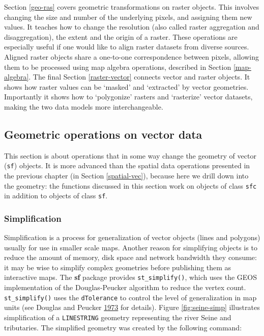 \documentclass[]{krantz}
\begin{document}
Section \ref{geo-ras} covers geometric transformations on raster objects.
This involves changing the size and number of the underlying pixels, and assigning them new values.
It teaches how to change the resolution (also called raster aggregation and disaggregation), the extent and the origin of a raster.
These operations are especially useful if one would like to align raster datasets from diverse sources.
Aligned raster objects share a one-to-one correspondence between pixels, allowing them to be processed using map algebra operations, described in Section \ref{map-algebra}. The final Section \ref{raster-vector} connects vector and raster objects.
It shows how raster values can be `masked' and `extracted' by vector geometries.
Importantly it shows how to `polygonize' rasters and `rasterize' vector datasets, making the two data models more interchangeable.

\hypertarget{geo-vec}{%
\subsection{Geometric operations on vector data}\label{geo-vec}}

This section is about operations that in some way change the geometry of vector (\texttt{sf}) objects.
It is more advanced than the spatial data operations presented in the previous chapter (in Section \ref{spatial-vec}), because here we drill down into the geometry:
the functions discussed in this section work on objects of class \texttt{sfc} in addition to objects of class \texttt{sf}.

\hypertarget{simplification}{%
\subsubsection{Simplification}\label{simplification}}

Simplification is a process for generalization of vector objects (lines and polygons) usually for use in smaller scale maps.
Another reason for simplifying objects is to reduce the amount of memory, disk space and network bandwidth they consume:
it may be wise to simplify complex geometries before publishing them as interactive maps.
The \textbf{sf} package provides \texttt{st\_simplify()}, which uses the GEOS implementation of the Douglas-Peucker algorithm to reduce the vertex count.
\texttt{st\_simplify()} uses the \texttt{dTolerance} to control the level of generalization in map units (see Douglas and Peucker \protect\hyperlink{ref-douglas_algorithms_1973}{1973} for details).
Figure \ref{fig:seine-simp} illustrates simplification of a \texttt{LINESTRING} geometry representing the river Seine and tributaries.
The simplified geometry was created by the following command:
\end{document}
